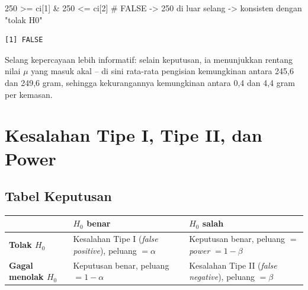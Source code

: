\documentclass[
  indonesian,
  letterpaper,
]{book}
\newenvironment{Shaded}{\begin{snugshade}}{\end{snugshade}}
\newcommand{\CommentTok}[1]{\textcolor[rgb]{0.37,0.37,0.37}{#1}}
\newcommand{\DecValTok}[1]{\textcolor[rgb]{0.68,0.00,0.00}{#1}}
\newcommand{\NormalTok}[1]{\textcolor[rgb]{0.00,0.23,0.31}{#1}}
\newcommand{\SpecialCharTok}[1]{\textcolor[rgb]{0.37,0.37,0.37}{#1}}
\newcounter{none} %
\begin{document}
\begin{Shaded}
\begin{Highlighting}[]
\DecValTok{250} \SpecialCharTok{\textgreater{}=}\NormalTok{ ci[}\DecValTok{1}\NormalTok{] }\SpecialCharTok{\&} \DecValTok{250} \SpecialCharTok{\textless{}=}\NormalTok{ ci[}\DecValTok{2}\NormalTok{]   }\CommentTok{\# FALSE {-}\textgreater{} 250 di luar selang {-}\textgreater{} konsisten dengan "tolak H0"}
\end{Highlighting}
\end{Shaded}

\begin{verbatim}
[1] FALSE
\end{verbatim}

Selang kepercayaan lebih informatif: selain keputusan, ia menunjukkan
rentang nilai \(\mu\) yang masuk akal -- di sini rata-rata pengisian
kemungkinan antara 245,6 dan 249,6 gram, sehingga kekurangannya
kemungkinan antara 0,4 dan 4,4 gram per kemasan.

\section{Kesalahan Tipe I, Tipe II, dan
Power}\label{kesalahan-tipe-i-tipe-ii-dan-power}

\subsection{Tabel Keputusan}\label{tabel-keputusan}

{\def\LTcaptype{none} %
\begin{longtable}[]{@{}
  >{\raggedright\arraybackslash}p{}
  >{\raggedright\arraybackslash}p{}
  >{\raggedright\arraybackslash}p{}@{}}
\toprule\noalign{}
\begin{minipage}[b]{\linewidth}\raggedright
\end{minipage} & \begin{minipage}[b]{\linewidth}\raggedright
\(H_0\) benar
\end{minipage} & \begin{minipage}[b]{\linewidth}\raggedright
\(H_0\) salah
\end{minipage} \\
\midrule\noalign{}
\endhead
\bottomrule\noalign{}
\endlastfoot
\textbf{Tolak \(H_0\)} & Kesalahan Tipe I (\emph{false positive}),
peluang \(= \alpha\) & Keputusan benar, peluang \(=\) \emph{power}
\(= 1 - \beta\) \\
\textbf{Gagal menolak \(H_0\)} & Keputusan benar, peluang
\(= 1 - \alpha\) & Kesalahan Tipe II (\emph{false negative}), peluang
\(= \beta\) \\
\end{longtable}
}
\end{document}

